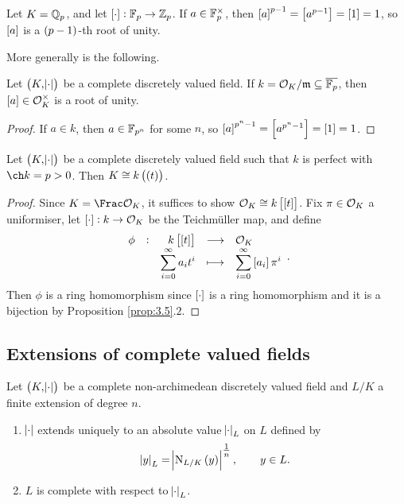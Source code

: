 \begin{example}
Let $ K = \mathbb{Q}_p $, and let $ \sbr{\cdot} : \FF_p \to \ZZ_p $. If $ a \in \mathbb{F}_p^\times $, then $ \sbr{a}^{p - 1} = \sbr{a^{p - 1}} = \sbr{1} = 1 $, so $ \sbr{a} $ is a $ \br{p - 1} $-th root of unity.
\end{example}

More generally is the following.

\begin{lemma}
Let $ \br{K, \abs{\cdot}} $ be a complete discretely valued field. If $ k = \mathcal{O}_K / \mathfrak{m} \subseteq \overline{\mathbb{F}_p} $, then $ \sbr{a} \in \OOO_K^\times $ is a root of unity.
\end{lemma}

\begin{proof}
If $ a \in k $, then $ a \in \mathbb{F}_{p^n} $ for some $ n $, so $ \sbr{a}^{p^n - 1} = \sbr{a^{p^n - 1}} = \sbr{1} = 1 $.
\end{proof}

\begin{theorem}
\label{thm:5.7}
Let $ \br{K, \abs{\cdot}} $ be a complete discretely valued field such that $ k $ is perfect with $ \ch k = p > 0 $. Then $ K \cong k\br{\br{t}} $.
\end{theorem}

\begin{proof}
Since $ K = \Frac \OOO_K $, it suffices to show $ \OOO_K \cong k\sbr{\sbr{t}} $. Fix $ \pi \in \mathcal{O}_K $ a uniformiser, let $ \sbr{\cdot} : k \to \OOO_K $ be the Teichm\"uller map, and define
$$ \function[\phi]{k\sbr{\sbr{t}}}{\OOO_K}{\sum_{i = 0}^\infty a_it^i}{\sum_{i = 0}^\infty \sbr{a_i}\pi^i}. $$
Then $ \phi $ is a ring homomorphism since $ \sbr{\cdot} $ is a ring homomorphism and it is a bijection by Proposition \ref{prop:3.5}.$ 2 $.
\end{proof}

\subsection{Extensions of complete valued fields}


\begin{theorem}
\label{thm:6.1}
Let $ \br{K, \abs{\cdot}} $ be a complete non-archimedean discretely valued field and $ L / K $ a finite extension of degree $ n $.
\begin{enumerate}
\item $ \abs{\cdot} $ extends uniquely to an absolute value $ \abs{\cdot}_L $ on $ L $ defined by
$$ \abs{y}_L = \abs{\N_{L / K}\br{y}}^{\tfrac{1}{n}}, \qquad y \in L. $$
\item $ L $ is complete with respect to $ \abs{\cdot}_L $.
\end{enumerate}
\end{theorem}

